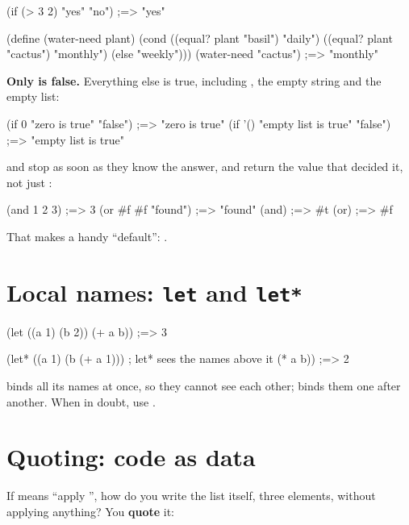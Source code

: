 \begin{scm}
(if (> 3 2) "yes" "no")        ;=> "yes"

(define (water-need plant)
  (cond ((equal? plant "basil") "daily")
        ((equal? plant "cactus") "monthly")
        (else "weekly")))
(water-need "cactus")          ;=> "monthly"
\end{scm}

\textbf{Only  is false.} Everything else is true, including
, the empty string and the empty list:

\begin{scm}
(if 0 "zero is true" "false")               ;=> "zero is true"
(if '() "empty list is true" "false")       ;=> "empty list is true"
\end{scm}

 and  stop as soon as they know the answer, and return
the value that decided it, not just :

\begin{scm}
(and 1 2 3)                    ;=> 3
(or #f #f "found")             ;=> "found"
(and)                          ;=> #t
(or)                           ;=> #f
\end{scm}

That makes  a handy ``default'': .

\section{Local names: \texttt{let} and \texttt{let*}}

\begin{scm}
(let ((a 1) (b 2))
  (+ a b))                     ;=> 3

(let* ((a 1)
       (b (+ a 1)))            ; let* sees the names above it
  (* a b))                     ;=> 2
\end{scm}

 binds all its names at once, so they cannot see each other;
 binds them one after another. When in doubt, use .

\section{Quoting: code as data}

If  means ``apply \code{+}'', how do you write the list
itself, three elements, without applying anything? You \textbf{quote} it:

